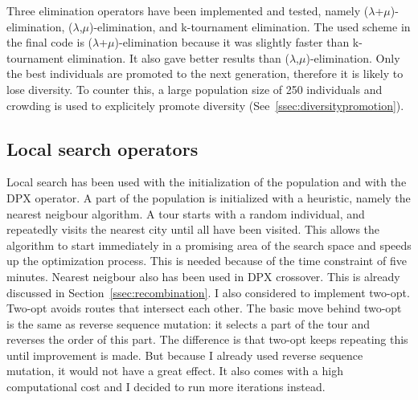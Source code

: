 \documentclass[a4paper,10pt]{article}
\newcommand{\ReplaceMe}[1]{{\color{blue}#1}}
\begin{document}

Three elimination operators have been implemented and tested, namely ($\lambda$+$\mu$)-elimination, ($\lambda$,$\mu$)-elimination, and k-tournament elimination. The used scheme in the final code is ($\lambda$+$\mu$)-elimination because it was slightly faster than k-tournament elimination. It also gave better results than ($\lambda$,$\mu$)-elimination. Only the best individuals are promoted to the next generation, therefore it is likely to lose diversity. To counter this, a large population size of 250 individuals and crowding is used to explicitely promote diversity (See~\ref{ssec:diversitypromotion}). 

\subsection{Local search operators}\label{ssec:localsearch}

Local search has been used with the initialization of the population and with the DPX operator. A part of the population is initialized with a heuristic, namely the nearest neigbour algorithm. A tour starts with a random individual, and repeatedly visits the nearest city until all have been visited. This allows the algorithm to start immediately in a promising area of the search space and speeds up the optimization process. This is needed because of the time constraint of five minutes. Nearest neigbour also has been used in DPX crossover. This is already discussed in Section~\ref{ssec:recombination}.
I also considered to implement two-opt. Two-opt avoids routes that intersect each other. The basic move behind two-opt is the same as reverse sequence mutation: it selects a part of the tour and reverses the order of this part. The difference is that two-opt keeps repeating this until improvement is made. But because I already used reverse sequence mutation, it would not have a great effect. It also comes with a high computational cost and I decided to run more iterations instead.  
\end{document}

